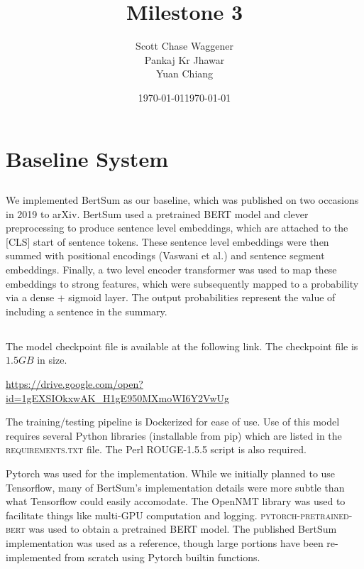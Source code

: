 \documentclass[12pt]{article}
\title{Milestone 3}
\author{
		Scott Chase Waggener \\
		Pankaj Kr Jhawar \\
		Yuan Chiang \\
}
\date{\today}
\date{\today}
\begin{document}
\maketitle

\section{Baseline System}

\subsection{}

We implemented BertSum as our baseline, which was published on two
occasions in 2019 to arXiv. BertSum used a pretrained BERT model and
clever preprocessing to produce sentence level embeddings, which are
attached to the [CLS] start of sentence tokens. These sentence level
embeddings were then summed with positional encodings (Vaswani et al.)
and sentence segment embeddings. Finally, a two level encoder
transformer was used to map these embeddings to strong features, which
were subsequently mapped to a probability via a dense + sigmoid layer.
The output probabilities represent the value of including a sentence
in the summary.

\subsection{}

The model checkpoint file is available at the following link. The
checkpoint file is $1.5GB$ in size.
\newline

\url{https://drive.google.com/open?id=1gEXSIOkxwAK_H1gE950MXmoWI6Y2VwUg}
\newline

The training/testing pipeline is Dockerized for ease of use. Use of
this model requires several Python libraries (installable from pip)
which are listed in the \textsc{requirements.txt} file. The Perl
ROUGE-1.5.5 script is also required.
\newline

Pytorch was used for the implementation. While we initially planned to
use Tensorflow, many of BertSum's implementation details were more
subtle than what Tensorflow could easily accomodate. The OpenNMT
library was used to facilitate things like multi-GPU computation and
logging. \textsc{pytorch-pretrained-bert} was used to obtain a
pretrained BERT model. The published BertSum implementation was used
as a reference, though large portions have been re-implemented from
scratch using Pytorch builtin functions.
\end{document}
